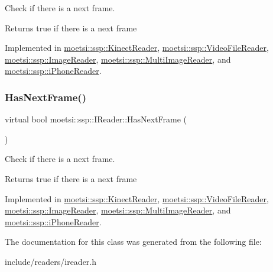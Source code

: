 Check if there is a next frame. 

\begin{DoxyReturn}{Returns}
true if there is a next frame 
\end{DoxyReturn}


Implemented in \hyperlink{classmoetsi_1_1ssp_1_1KinectReader_a08934b6eff437142e482bb21780ca171}{moetsi\+::ssp\+::\+Kinect\+Reader}, \hyperlink{classmoetsi_1_1ssp_1_1VideoFileReader_ab5733b56b6d6dd7596eac9d914481c7e}{moetsi\+::ssp\+::\+Video\+File\+Reader}, \hyperlink{classmoetsi_1_1ssp_1_1ImageReader_ad8e87720ca0ec97de501f1070119b28d}{moetsi\+::ssp\+::\+Image\+Reader}, \hyperlink{classmoetsi_1_1ssp_1_1MultiImageReader_a04240c98d28d8949fca4ecdcb04f04f5}{moetsi\+::ssp\+::\+Multi\+Image\+Reader}, and \hyperlink{classmoetsi_1_1ssp_1_1iPhoneReader_a35ca55a03a9fb7b559f9381b11f53bfe}{moetsi\+::ssp\+::i\+Phone\+Reader}.

\mbox{\label{classmoetsi_1_1ssp_1_1IReader_af9186ba41e136dc4ec3242b5dd55fa04}} 
\subsubsection{\texorpdfstring{Has\+Next\+Frame()}{HasNextFrame()}\hspace{0.1cm}{\footnotesize\ttfamily [2/2]}}
{\footnotesize\ttfamily virtual bool moetsi\+::ssp\+::\+I\+Reader\+::\+Has\+Next\+Frame (\begin{DoxyParamCaption}{ }\end{DoxyParamCaption})\hspace{0.3cm}{\ttfamily [pure virtual]}}



Check if there is a next frame. 

\begin{DoxyReturn}{Returns}
true if there is a next frame 
\end{DoxyReturn}


Implemented in \hyperlink{classmoetsi_1_1ssp_1_1KinectReader_a08934b6eff437142e482bb21780ca171}{moetsi\+::ssp\+::\+Kinect\+Reader}, \hyperlink{classmoetsi_1_1ssp_1_1VideoFileReader_ab5733b56b6d6dd7596eac9d914481c7e}{moetsi\+::ssp\+::\+Video\+File\+Reader}, \hyperlink{classmoetsi_1_1ssp_1_1ImageReader_ad8e87720ca0ec97de501f1070119b28d}{moetsi\+::ssp\+::\+Image\+Reader}, \hyperlink{classmoetsi_1_1ssp_1_1MultiImageReader_a04240c98d28d8949fca4ecdcb04f04f5}{moetsi\+::ssp\+::\+Multi\+Image\+Reader}, and \hyperlink{classmoetsi_1_1ssp_1_1iPhoneReader_a35ca55a03a9fb7b559f9381b11f53bfe}{moetsi\+::ssp\+::i\+Phone\+Reader}.



The documentation for this class was generated from the following file\+:\begin{DoxyCompactItemize}
\item 
include/readers/ireader.\+h\end{DoxyCompactItemize}
